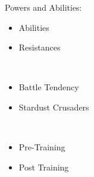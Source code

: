 \documentclass[a4paper,12pt]{article}
\begin{document}
Powers and Abilities:\\ \par \vspace{0.5cm}

\begin{itemize}
\item Abilities
\item Resistances
\end{itemize}\\ \par \vspace{0.5cm}

\begin{itemize}
\item Battle Tendency
\item Stardust Crusaders
\end{itemize}\\ \par \vspace{0.5cm}

\begin{itemize}
\item Pre-Training
\item Post Training
\end{itemize}\\ \par \vspace{0.5cm}
\end{document}
